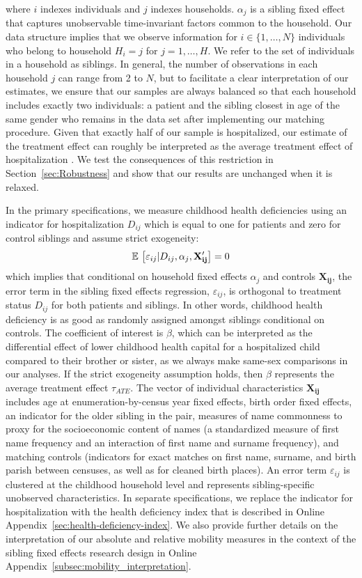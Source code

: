\documentclass[12pt,english]{article}
\begin{document}
\noindent where $i$ indexes individuals and $j$ indexes households. $\alpha_j$ is a sibling fixed effect that captures unobservable time-invariant factors common to the household. Our data structure implies that we observe information for $i \in \{1,\ldots,N\}$ individuals who belong to household $H_i=j$ for $j=1,\ldots, H$. We refer to the set of individuals in a household as siblings. In general, the number of observations in each household $j$ can range from 2 to $N$, but to facilitate a clear interpretation of our estimates, we ensure that our samples are always balanced so that each household includes exactly two individuals: a patient and the sibling closest in age of the same gender who remains in the data set after implementing our matching procedure. Given that exactly half of our sample is hospitalized, our estimate of the treatment effect can roughly be interpreted as the average treatment effect of hospitalization \citep{Sloczynski2020}. We test the consequences of this restriction in Section~\ref{sec:Robustness} and show that our results are unchanged when it is relaxed.

In the primary specifications, we measure childhood health deficiencies using an indicator for hospitalization $D_{ij}$ which is equal to one for patients and zero for control siblings and assume strict exogeneity: 
\begin{equation*}
    \mathop{\mathbb E\,} \left[\varepsilon_{ij} | D_{ij}, \alpha_{j}, \mathbf{X_{ij}'}\right]=0
\end{equation*}
\noindent which implies that conditional on household fixed effects $\alpha_j$ and controls $\mathbf{X_{ij}}$, the error term in the sibling fixed effects regression, $\varepsilon_{ij}$, is orthogonal to treatment status $D_{ij}$ for both patients and siblings. In other words, childhood health deficiency is as good as randomly assigned amongst siblings conditional on controls. The coefficient of interest is $\beta$, which can be interpreted as the differential effect of lower childhood health capital for a hospitalized child compared to their brother or sister, as we always make same-sex comparisons in our analyses. If the strict exogeneity assumption holds, then $\beta$ represents the average treatment effect $\tau_{ATE}$. The vector of individual characteristics $\mathbf{X_{ij}}$ includes age at enumeration-by-census year fixed effects, birth order fixed effects, an indicator for the older sibling in the pair, measures of name commonness to proxy for the socioeconomic content of names (a standardized measure of first name frequency and an interaction of first name and surname frequency), and matching controls (indicators for exact matches on first name, surname, and birth parish between censuses, as well as for cleaned birth places). An error term $\varepsilon_{ij}$ is clustered at the childhood household level and represents sibling-specific unobserved characteristics. In separate specifications, we replace the indicator for hospitalization with the health deficiency index that is described in Online Appendix~\ref{sec:health-deficiency-index}. We also provide further details on the interpretation of our absolute and relative mobility measures in the context of the sibling fixed effects research design in Online Appendix~\ref{subsec:mobility_interpretation}.
\end{document}
